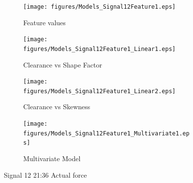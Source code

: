 \documentclass[]{article}
\begin{document}
\begin{figure}[H]
	\captionsetup[subfigure]{justification=Centering}
    \centering
    
		\begin{subfigure}{.45\textwidth}
		  \centering
    			\texttt{[image: figures/Models\_Signal12Feature1.eps]}
		  	\caption{Feature values}
		  	\label{fig:Models_Signal12Feature1}
		\end{subfigure}%
		\begin{subfigure}{.45\textwidth}
		  \centering
 		   	\texttt{[image: figures/Models\_Signal12Feature1\_Linear1.eps]}
		  	\caption{Clearance vs Shape Factor}
		  	\label{fig:Models_Signal12Feature1_Linear1}
		\end{subfigure}
		
		\bigskip
		
		\begin{subfigure}{.45\textwidth}
		  \centering
 		   	\texttt{[image: figures/Models\_Signal12Feature1\_Linear2.eps]}
		  	\caption{Clearance vs Skewness}
		  	\label{fig:Models_Signal12Feature1_Linear2}
		\end{subfigure}
		\begin{subfigure}{.45\textwidth}
		  \centering
 		   	\texttt{[image: figures/Models\_Signal12Feature1\_Multivariate1.eps]}
		  	\caption{Multivariate Model}
		  	\label{fig:Models_Signal12Feature1_Multivariate1}
		\end{subfigure}
		
    \caption{Signal 12 21:36 Actual force}
    \label{fig:Models_Signal12Feature1_Caption}
\end{figure}
\end{document}
